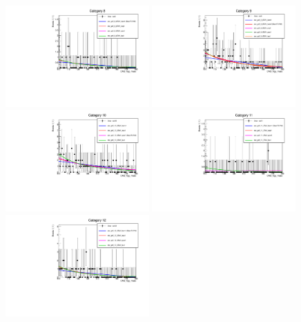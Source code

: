 \begin{figure}
  \includegraphics[width=0.49\textwidth]{ch5_anal_and_results/plots/mva_8TeV/multipdf_cat8.pdf}
  \includegraphics[width=0.49\textwidth]{ch5_anal_and_results/plots/mva_8TeV/multipdf_cat9.pdf}\\
  \includegraphics[width=0.49\textwidth]{ch5_anal_and_results/plots/mva_8TeV/multipdf_cat10.pdf}
  \includegraphics[width=0.49\textwidth]{ch5_anal_and_results/plots/mva_8TeV/multipdf_cat11.pdf}\\
  \includegraphics[width=0.49\textwidth]{ch5_anal_and_results/plots/mva_8TeV/multipdf_cat12.pdf}

\end{figure}
